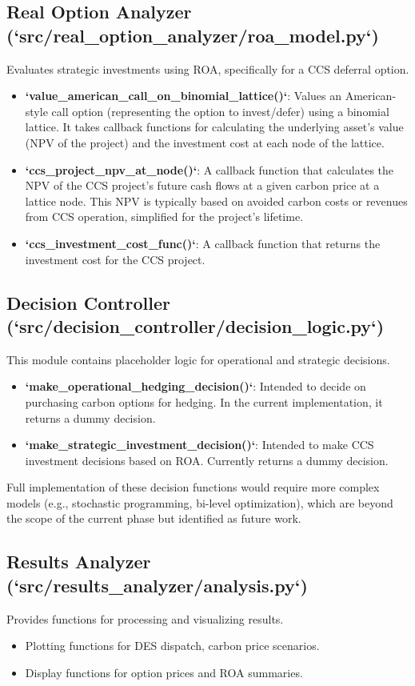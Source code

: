 \subsection{Real Option Analyzer (`src/real_option_analyzer/roa_model.py`)}
Evaluates strategic investments using ROA, specifically for a CCS deferral option.
\begin{itemize}
    \item \textbf{`value_american_call_on_binomial_lattice()`}: Values an American-style call option (representing the option to invest/defer) using a binomial lattice. It takes callback functions for calculating the underlying asset's value (NPV of the project) and the investment cost at each node of the lattice.
    \item \textbf{`ccs_project_npv_at_node()`}: A callback function that calculates the NPV of the CCS project's future cash flows at a given carbon price at a lattice node. This NPV is typically based on avoided carbon costs or revenues from CCS operation, simplified for the project's lifetime.
    \item \textbf{`ccs_investment_cost_func()`}: A callback function that returns the investment cost for the CCS project.
\end{itemize}

\subsection{Decision Controller (`src/decision_controller/decision_logic.py`)}
This module contains placeholder logic for operational and strategic decisions.
\begin{itemize}
    \item \textbf{`make_operational_hedging_decision()`}: Intended to decide on purchasing carbon options for hedging. In the current implementation, it returns a dummy decision.
    \item \textbf{`make_strategic_investment_decision()`}: Intended to make CCS investment decisions based on ROA. Currently returns a dummy decision.
\end{itemize}
Full implementation of these decision functions would require more complex models (e.g., stochastic programming, bi-level optimization), which are beyond the scope of the current phase but identified as future work.

\subsection{Results Analyzer (`src/results_analyzer/analysis.py`)}
Provides functions for processing and visualizing results.
\begin{itemize}
    \item Plotting functions for DES dispatch, carbon price scenarios.
    \item Display functions for option prices and ROA summaries.
\end{itemize}

